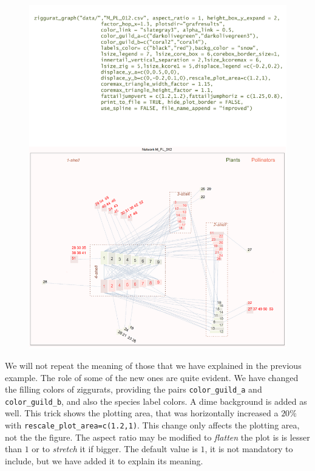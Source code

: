 \documentclass[12pt]{article}
\begin{document}
\clearpage
\begin{figure}[hbt!]
\centering
\includegraphics[scale=0.75]{M_PL_012_ziggurat_improved.pdf}
\label{fig:KMAN_ziggurat_012_improved}
\end{figure}

\clearpage
We will not repeat the meaning of those that we have explained in the previous example. The role of some of the new ones are quite
evident. We have changed the filling colors of ziggurats, providing the pairs \texttt{color\_guild\_a} and \texttt{color\_guild\_b},
and also the species label colors. A dime background is added as well. This trick shows the plotting area, that was horizontally increased
a $20\%$ with \texttt{rescale\_plot\_area=c(1.2,1)}. This change only affects the plotting area, not the the figure. The aspect ratio may
be modified to \textit{flatten} the plot is is lesser than $1$ or to \textit{stretch} it if bigger. The default value is $1$, it is not mandatory
to include, but we have added it to explain its meaning.
\end{document}
